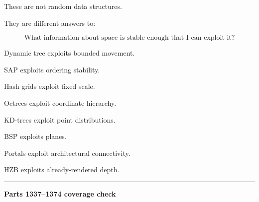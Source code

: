 These are not random data structures.

They are different answers to:

\[
\boxed{
\text{What information about space is stable enough that I can exploit it?}
}
\]

Dynamic tree exploits bounded movement.

SAP exploits ordering stability.

Hash grids exploit fixed scale.

Octrees exploit coordinate hierarchy.

KD-trees exploit point distributions.

BSP exploits planes.

Portals exploit architectural connectivity.

HZB exploits already-rendered depth.

\begin{center}\rule{0.5\linewidth}{0.5pt}\end{center}

\textbf{Parts 1337--1374 coverage check}

